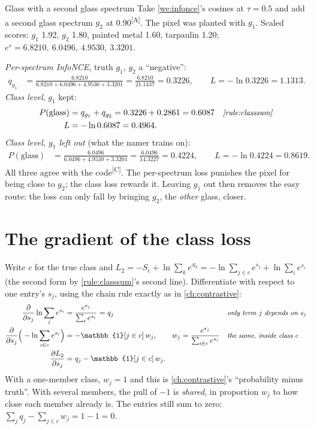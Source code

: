 \documentclass[11pt,a4paper,oneside,openany]{book}
\newcommand{\comp}{\textsuperscript{\textsf{\scriptsize[C]}}}
\newcommand{\assm}{\textsuperscript{\textsf{\scriptsize[A]}}}
\newcommand{\why}[1]{&&\text{\small\itshape #1}}
\begin{document}
\begin{worked}[label=we:asbuilt:classscore]{Glass with a second glass spectrum}
Take \cref{we:infonce}'s cosines at $\tau=0.5$ and add a second glass spectrum $g_2$ at 0.90\assm. The pixel was planted with $g_1$. Scaled scores: $g_1$ 1.92, $g_2$ 1.80,
painted metal 1.60, tarpaulin 1.20; $e^{s}=6.8210,\ 6.0496,\ 4.9530,\ 3.3201$.

\emph{Per-spectrum InfoNCE}, truth $g_1$, $g_2$ a ``negative'':
\begin{align*}
q_{g_1} &= \frac{6.8210}{6.8210+6.0496+4.9530+3.3201} = \frac{6.8210}{21.1437} = 0.3226, \qquad L=-\ln0.3226=1.1313 .
\end{align*}
\emph{Class level}, $g_1$ kept:
\begin{align*}
P(\text{glass}) &= q_{g_1}+q_{g_2} = 0.3226+0.2861 = 0.6087 \why{\cref{rule:classsum}}\\
L &= -\ln0.6087 = 0.4964 .
\end{align*}
\emph{Class level, $g_1$ left out} (what the namer trains on):
\begin{align*}
P(\text{glass}) &= \frac{6.0496}{6.0496+4.9530+3.3201} = \frac{6.0496}{14.3227} = 0.4224, \qquad L=-\ln0.4224=0.8619 .
\end{align*}
All three agree with the code\comp. The per-spectrum loss punishes the pixel for being close to $g_2$; the class loss rewards it. Leaving $g_1$ out then removes the easy
route: the loss can only fall by bringing $g_2$, the \emph{other} glass, closer.
\end{worked}

\section{The gradient of the class loss}

Write $c$ for the true class and $L_2=-S_c+\ln\sum_{k}e^{S_k}=-\ln\sum_{j\in c}e^{s_j}+\ln\sum_ie^{s_i}$ (the second form by \cref{rule:classsum}'s second line).
Differentiate with respect to one entry's $s_j$, using the chain rule exactly as in \cref{ch:contrastive}:
\begin{align*}
\frac{\partial}{\partial s_j}\ln\sum_ie^{s_i} &= \frac{e^{s_j}}{\sum_ie^{s_i}}=q_j \why{only term $j$ depends on $s_j$}\\
\frac{\partial}{\partial s_j}\Big(-\ln\sum_{i\in c}e^{s_i}\Big) &= -\mathbb{1}[j\in c]\,w_j,\qquad w_j=\frac{e^{s_j}}{\sum_{i\in c}e^{s_i}} \why{the same, inside class $c$}\\
\frac{\partial L_2}{\partial s_j} &= q_j-\mathbb{1}[j\in c]\,w_j .
\end{align*}
With a one-member class, $w_j=1$ and this is \cref{ch:contrastive}'s ``probability minus truth''. With several members, the pull of $-1$ is \emph{shared}, in proportion
$w_j$ to how close each member already is. The entries still sum to zero: $\sum_jq_j-\sum_{j\in c}w_j=1-1=0$.
\end{document}
